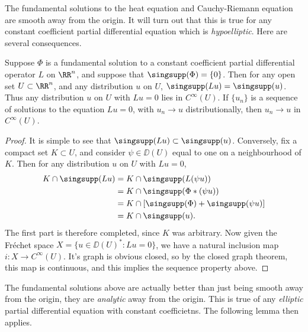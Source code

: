 The fundamental solutions to the heat equation and Cauchy-Riemann equation are smooth away from the origin. It will turn out that this is true for any constant coefficient partial differential equation which is \emph{hypoelliptic}. Here are several consequences.

\begin{lemma}
    Suppose $\Phi$ is a fundamental solution to a constant coefficient partial differential operator $L$ on $\RR^n$, and suppose that $\singsupp(\Phi) = \{ 0 \}$. Then for any open set $U \subset \RR^n$, and any distribution $u$ on $U$, $\singsupp(Lu) = \singsupp(u)$. Thus any distribution $u$ on $U$ with $Lu = 0$ lies in $C^\infty(U)$. If $\{ u_n \}$ is a sequence of solutions to the equation $Lu = 0$, with $u_n \to u$ distributionally, then $u_n \to u$ in $C^\infty(U)$.
\end{lemma}
\begin{proof}
    It is simple to see that $\singsupp(Lu) \subset \singsupp(u)$. Conversely, fix a compact set $K \subset U$, and consider $\psi \in \DD(U)$ equal to one on a neighbourhood of $K$. Then for any distribution $u$ on $U$ with $Lu = 0$,
    \begin{align*}
        K \cap \singsupp(Lu) &= K \cap \singsupp(L(\psi u))\\
        &= K \cap \singsupp(\Phi * (\psi u))\\
        &= K \cap [\singsupp(\Phi) + \singsupp(\psi u)]\\
        &= K \cap \singsupp(u).
    \end{align*}
    The first part is therefore completed, since $K$ was arbitrary. Now given the Fr\'{e}chet space $X = \{ u \in \DD(U)^* : Lu = 0 \}$, we have a natural inclusion map $i: X \to C^\infty(U)$. It's graph is obvious closed, so by the closed graph theorem, this map is continuous, and this implies the sequence property above.
\end{proof}

The fundamental solutions above are actually better than just being smooth away from the origin, they are \emph{analytic} away from the origin. This is true of any \emph{elliptic} partial differential equation with constant coefficietns. The following lemma then applies.

